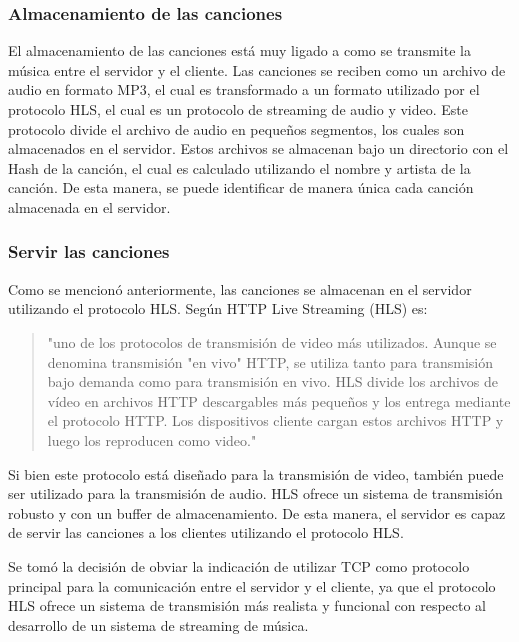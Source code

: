 \subsubsection{Almacenamiento de las canciones}

El almacenamiento de las canciones está muy ligado a como se transmite la
música entre el servidor y el cliente. Las canciones se reciben como un archivo 
de audio en formato MP3, el cual es transformado a un formato utilizado por el 
protocolo HLS, el cual es un protocolo de streaming de audio y video. Este
protocolo divide el archivo de audio en pequeños segmentos, los cuales son
almacenados en el servidor. Estos archivos se almacenan bajo un directorio
con el Hash de la canción, el cual es calculado utilizando el nombre y artista 
de la canción. De esta manera, se puede identificar de manera única cada
canción almacenada en el servidor.

\subsubsection{Servir las canciones}

Como se mencionó anteriormente, las canciones se almacenan en el servidor
utilizando el protocolo HLS. Según \cite{cloudflare} HTTP Live Streaming (HLS) es:

\begin{quote}
    "uno de los protocolos de transmisión de video más utilizados. Aunque se
    denomina transmisión "en vivo" HTTP, se utiliza tanto para transmisión bajo
    demanda como para transmisión en vivo. HLS divide los archivos de vídeo en
    archivos HTTP descargables más pequeños y los entrega mediante el protocolo
    HTTP. Los dispositivos cliente cargan estos archivos HTTP y luego los
    reproducen como video."
\end{quote}

Si bien este protocolo está diseñado para la transmisión de video, también
puede ser utilizado para la transmisión de audio. HLS ofrece un sistema de 
transmisión robusto y con un buffer de almacenamiento. De esta manera, el
servidor es capaz de servir las canciones a los clientes utilizando el protocolo
HLS.

Se tomó la decisión de obviar la indicación de utilizar TCP como protocolo 
principal para la comunicación entre el servidor y el cliente, ya que el
protocolo HLS ofrece un sistema de transmisión más realista y funcional
con respecto al desarrollo de un sistema de streaming de música.


